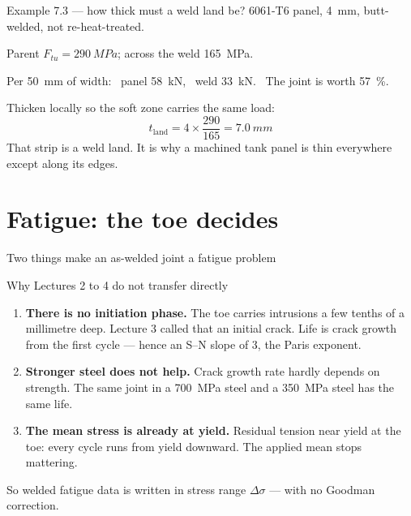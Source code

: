 \documentclass[aspectratio=169,10pt]{beamer}
\begin{document}
\begin{frame}{Example 7.3 --- how thick must a weld land be?}
6061-T6 panel, \SI{4}{mm}, butt-welded, not re-heat-treated.

Parent $F_{tu}=\SI{290}{MPa}$; across the weld \SI{165}{MPa}.

\vfill
Per \SI{50}{mm} of width: \ panel \SI{58}{kN}, \ weld \SI{33}{kN}. \ The joint is worth
\alert{\SI{57}{\percent}}.

\vfill
Thicken locally so the soft zone carries the same load:
\[ t_{\text{land}}=4\times\frac{290}{165}=\SI{7.0}{mm} \]
That strip is a weld land. It is why a machined tank panel is thin everywhere except along its edges.
\end{frame}

\section{Fatigue: the toe decides}

\begin{frame}{Two things make an as-welded joint a fatigue problem}
\centering
\resizebox{0.98\textwidth}{!}{}
\end{frame}

\begin{frame}{Why Lectures 2 to 4 do not transfer directly}
\begin{enumerate}
  \item \textbf{There is no initiation phase.} The toe carries intrusions a few tenths of a
        millimetre deep. Lecture 3 called that an initial crack. Life is \alert{crack growth from
        the first cycle} --- hence an S--N slope of 3, the Paris exponent.
  \item \textbf{Stronger steel does not help.} Crack growth rate hardly depends on strength. The
        same joint in a \SI{700}{MPa} steel and a \SI{350}{MPa} steel has the \alert{same life}.
  \item \textbf{The mean stress is already at yield.} Residual tension near yield at the toe: every
        cycle runs from yield downward. The applied mean stops mattering.
\end{enumerate}
\vfill
So welded fatigue data is written in \alert{stress range} $\Delta\sigma$ --- with no Goodman correction.
\end{frame}
\end{document}
